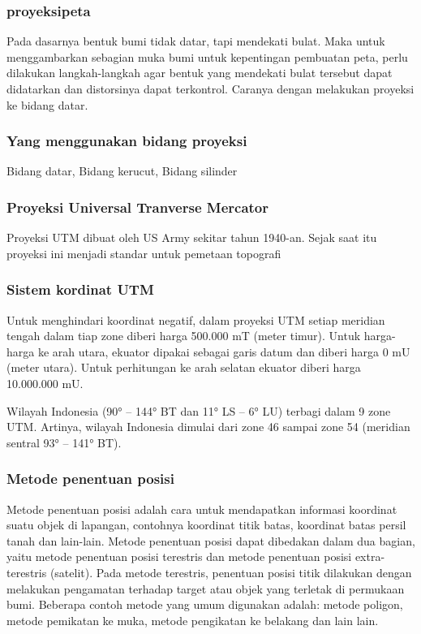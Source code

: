 \subsubsection{proyeksipeta}
Pada dasarnya bentuk bumi tidak datar, tapi mendekati bulat. Maka untuk menggambarkan sebagian muka bumi untuk kepentingan pembuatan peta, perlu dilakukan langkah-langkah agar bentuk yang mendekati bulat tersebut dapat didatarkan dan distorsinya dapat terkontrol. Caranya dengan melakukan proyeksi ke bidang datar.
\subsubsection{Yang menggunakan bidang proyeksi}
Bidang datar, Bidang kerucut, Bidang silinder
\subsubsection{Proyeksi Universal Tranverse Mercator}
Proyeksi UTM dibuat oleh US Army sekitar tahun 1940-an. Sejak saat itu proyeksi ini menjadi standar untuk pemetaan topografi
\subsubsection{Sistem kordinat UTM}
Untuk menghindari koordinat negatif, dalam proyeksi UTM setiap meridian tengah dalam tiap zone diberi harga 500.000 mT (meter timur). Untuk harga-harga ke arah utara, ekuator dipakai sebagai garis datum dan diberi harga 0 mU (meter utara). Untuk perhitungan ke arah selatan ekuator diberi harga 10.000.000 mU.

   Wilayah Indonesia (90° – 144° BT dan 11° LS – 6° LU) terbagi dalam 9 zone UTM. Artinya, wilayah Indonesia dimulai dari zone 46 sampai zone 54 (meridian sentral 93° – 141° BT).
\subsubsection{Metode penentuan posisi}
Metode penentuan posisi adalah cara untuk mendapatkan informasi koordinat suatu objek di lapangan, contohnya koordinat titik batas, koordinat batas persil tanah dan lain-lain. Metode penentuan posisi dapat dibedakan dalam dua bagian, yaitu metode penentuan posisi terestris dan metode penentuan posisi extra-terestris (satelit).
Pada metode terestris, penentuan posisi titik dilakukan dengan melakukan pengamatan terhadap target atau objek yang terletak di permukaan bumi. Beberapa contoh metode yang umum digunakan adalah:
metode poligon, metode pemikatan ke muka, metode pengikatan ke belakang dan lain lain.
